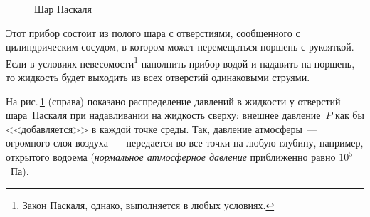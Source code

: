 \documentclass[main.tex]{subfiles}
\begin{document}
\begin{figure}[H]
{\begin{subfigure}{\subB\linewidth}
\end{subfigure}}%
\hfill\mbox{}
\caption{Шар Паскаля}
\label{fig:p47}
\end{figure}

Этот прибор состоит из полого шара с отверстиями, сообщенного с цилиндрическим сосудом, в котором может перемещаться поршень с рукояткой. Если в условиях невесомости\footnote{Закон Паскаля, однако, выполняется в любых условиях.} наполнить прибор водой и надавить на поршень, то жидкость будет выходить из всех отверстий одинаковыми струями. 

На рис.\,\ref{fig:p47} (справа) показано распределение давлений в жидкости у отверстий шара~Паскаля при надавливании на жидкость сверху: внешнее давление~$P$ как бы <<добавляется>> в каждой точке среды. Так, давление атмосферы~--- огромного слоя воздуха~--- передается во все точки на любую глубину, например, открытого водоема (\emph{нормальное атмосферное давление} приближенно равно $10^5$~Па).

\medskip
\end{document}
